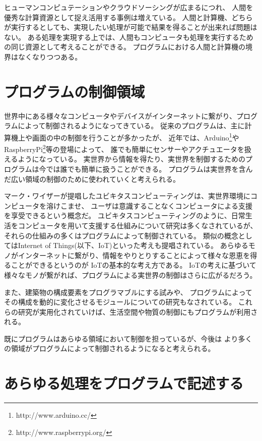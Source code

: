 ヒューマンコンピュテーションやクラウドソーシングが広まるにつれ、
人間を優秀な計算資源として捉え活用する事例は増えている。
人間と計算機、どちらが実行するとしても、実現したい処理が可能で結果を得ることが出来れば問題はない。
ある処理を実現する上では、人間もコンピュータも処理を実行するための同じ資源として考えることができる。
プログラムにおける人間と計算機の境界はなくなりつつある。

\section{プログラムの制御領域}\label{sec:are-of-program}

世界中にある様々なコンピュータやデバイスがインターネットに繋がり、プログラムによって制御されるようになってきている。
従来のプログラムは、主に計算機上や画面の中の制御を行うことが多かったが、
近年では、Arduino\footnote{http://www.arduino.cc/}やRaspberryPi\footnote{http://www.raspberrypi.org/}等の登場によって、
誰でも簡単にセンサーやアクチュエータを扱えるようになっている。
実世界から情報を得たり、実世界を制御するためのプログラムは今では誰でも簡単に扱うことができる。
プログラムは実世界を含んだ広い領域の制御のために使われていくと考えられる。

マーク・ワイザーが提唱したユビキタスコンピューティング\cite{weiser1991computer}は、実世界環境にコンピュータを溶けこませ、
ユーザは意識することなくコンピュータによる支援を享受できるという概念だ。
ユビキタスコンピューティングのように、日常生活をコンピュータを用いて支援する仕組みについて研究は多くなされているが、
それらの仕組みの多くはプログラムによって制御されている。
類似の概念としてはInternet of
Things(以下、IoT)\cite{iot}といった考えも提唱されている。
あらゆるモノがインターネットに繋がり、情報をやりとりすることによって様々な恩恵を得ることができるというのが
IoTの基本的な考え方である。
IoTの考えに基づいて様々なモノが繋がれば、プログラムによる実世界の制御はさらに広がるだろう。

また、建築物の構成要素をプログラマブルにする試み\cite{squama}や、
プログラムによってその構成を動的に変化させるモジュールについての研究もなされている。
これらの研究が実用化されていけば、生活空間や物質の制御にもプログラムが利用される。

既にプログラムはあらゆる領域において制御を担っているが、今後は
より多くの領域がプログラムによって制御されるようになると考えられる。

\section{あらゆる処理をプログラムで記述する}\label{ux3042ux3089ux3086ux308bux51e6ux7406ux3092ux30d7ux30edux30b0ux30e9ux30e0ux3067ux8a18ux8ff0ux3059ux308b}

